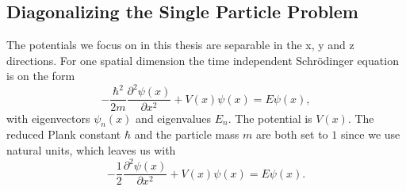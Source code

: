 \documentclass[../main.tex]{subfiles}
\begin{document}
\subsection{Diagonalizing the Single Particle Problem}\label{sec:Diag_SP_Problem}

The potentials we focus on in this thesis are separable in the x, y and z directions. For one spatial dimension the time independent Schr\"odinger equation is on the form
\begin{equation}
    -\frac{\hbar^2}{2m}\frac{\partial^2\psi(x)}{\partial x^2} + V(x)\psi(x) = E\psi(x),
\end{equation}
with eigenvectors $\psi_n(x)$ and eigenvalues $E_n$. The potential is $V(x)$. The reduced Plank constant $\hbar$ and the particle mass $m$ are both set to $1$ since we use natural units, which leaves us with
\begin{equation}\label{eq: SEq Natural}
    -\frac{1}{2}\frac{\partial^2\psi(x)}{\partial x^2} + V(x)\psi(x) = E\psi(x).
\end{equation}
\end{document}

